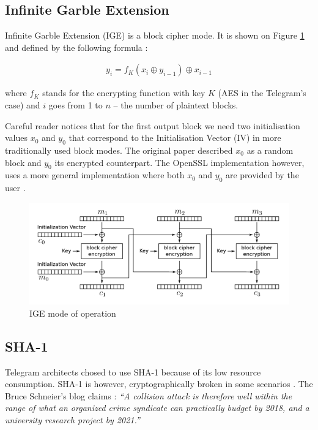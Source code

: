 \documentclass[thesis=M,english]{FITthesis}[2012/10/20]
\begin{document}
\subsection{Infinite Garble Extension}

Infinite Garble Extension (IGE) is a block cipher mode. It is shown on Figure \ref{img:telegram-ige-enc} and defined by the following formula \cite{telegram-openssl-ige}:

\begin{gather*} 
y_i = f_K(x_i \oplus y_{i-1}) \oplus x_{i-1}
\end{gather*}

where $f_K$ stands for the encrypting function with key $K$ (AES in the Telegram's case) and $i$ goes from 1 to $n$ -- the number of plaintext blocks.

Careful reader notices that for the first output block we need two initialisation values $x_0$ and $y_0$ that correspond to the Initialisation Vector (IV) in more traditionally used block modes. The original paper described $x_0$ as a random block and $y_0$ its encrypted counterpart. The OpenSSL implementation however, uses a more general implementation where both $x_0$ and $y_0$ are provided by the user \cite{telegram-openssl-ige}.

\begin{figure}[htb]
	\centering
	\includegraphics[width=1\textwidth]{telegram-ige-enc.png}
	\caption{IGE mode of operation \cite{telegram-aarhus}}
	\label{img:telegram-ige-enc}
\end{figure}


\subsection{SHA-1}

Telegram architects chosed to use SHA-1 because of its low resource consumption. SHA-1 is however, cryptographically broken in some scenarios \cite{telegram-sha1}. The Bruce Schneier's blog claims \cite{telegram-sha1}: \emph{``A collision attack is therefore well within the range of what an organized crime syndicate can practically budget by 2018, and a university research project by 2021.''}
\end{document}
